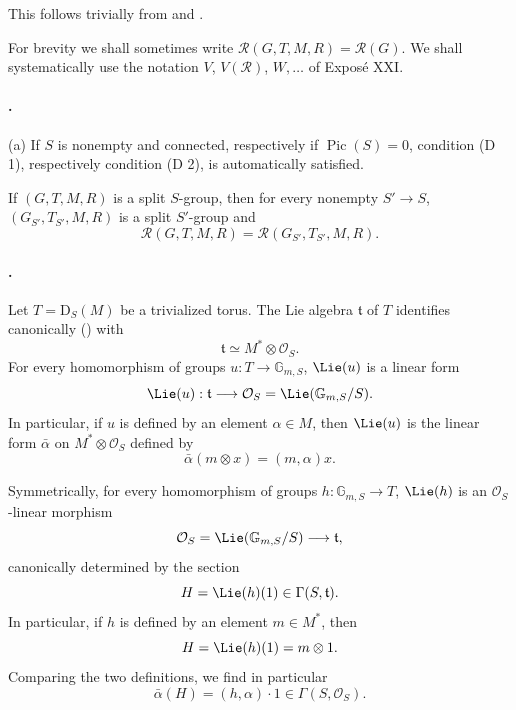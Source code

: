 This follows trivially from  and .

For brevity we shall sometimes write
\(\mathcal R(G,T,M,R)=\mathcal R(G)\). We shall systematically use
the notation \(V\), \(V(\mathcal R)\), \(W,\ldots\) of Exposé XXI.

\paragraph{.}
\textup{(a)} If \(S\) is nonempty and connected, respectively if
\(\operatorname{Pic}(S)=0\), condition \textup{(D 1)}, respectively
condition \textup{(D 2)}, is automatically satisfied.

\textup{} If \((G,T,M,R)\) is a split \(S\)-group, then for every
nonempty \(S'\to S\), \((G_{S'},T_{S'},M,R)\) is a split
\(S'\)-group and
\[
  \mathcal R(G,T,M,R)
  =
  \mathcal R(G_{S'},T_{S'},M,R).
\]

\paragraph{.}
Let \(T=\mathrm D_S(M)\) be a trivialized torus. The Lie algebra
\(\mathfrak t\) of \(T\) identifies canonically \textup{()} with
\[
  \mathfrak t\simeq M^*\otimes\mathcal O_S.
\]
For every homomorphism of groups \(u:T\to\mathbb G_{m,S}\),
\(\Lie(u)\) is a linear form
\[
  \Lie(u):
  \mathfrak t\longrightarrow
  \mathcal O_S=\Lie(\mathbb G_{m,S}/S).
\]
In particular, if \(u\) is defined by an element \(\alpha\in M\),
then \(\Lie(u)\) is the linear form \(\bar\alpha\) on
\(M^*\otimes\mathcal O_S\) defined by
\[
  \bar\alpha(m\otimes x)=(m,\alpha)x.
\]

Symmetrically, for every homomorphism of groups
\(h:\mathbb G_{m,S}\to T\), \(\Lie(h)\) is an
\(\mathcal O_S\)-linear morphism
\[
  \mathcal O_S=\Lie(\mathbb G_{m,S}/S)
  \longrightarrow\mathfrak t,
\]
canonically determined by the section
\[
  H=\Lie(h)(1)\in\Gamma(S,\mathfrak t).
\]
In particular, if \(h\) is defined by an element \(m\in M^*\), then
\[
  H=\Lie(h)(1)=m\otimes 1.
\]
Comparing the two definitions, we find in particular
\[
  \bar\alpha(H)=(h,\alpha)\cdot 1
  \in\Gamma(S,\mathcal O_S).
\]

